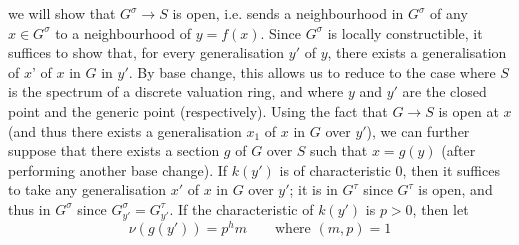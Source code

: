   we will show that \(G^\sigma \to  S\) is open, i.e. sends a neighbourhood in \(G^\sigma \) of any \(x\in  G^\sigma \) to a neighbourhood of \(y=f(x)\).
  Since \(G^\sigma \) is locally constructible, it suffices to show that, for every generalisation \(y'\) of \(y\), there exists a generalisation of \(x\)' of \(x\) in \(G\) in \(y'\).
  By base change, this allows us to reduce to the case where \(S\) is the spectrum of a discrete valuation ring, and where \(y\) and \(y'\) are the closed point and the generic point (respectively).
  Using the fact that \(G\to  S\) is open at \(x\) (and thus there exists a generalisation \(x_1\) of \(x\) in \(G\) over \(y'\)), we can further suppose that there exists a section \(g\) of \(G\) over \(S\) such that \(x=g(y)\) (after performing another base change).
  If \(k(y')\) is of characteristic \(0\), then it suffices to take any generalisation \(x'\) of \(x\) in \(G\) over \(y'\);
  it is in \(G^\tau \) since \(G^\tau \) is open, and thus in \(G^\sigma \) since \(G_{y'}^\sigma =G_{y'}^\tau \).
  If the characteristic of \(k(y')\) is \(p>0\), then let
  \[     \nu (g(y'))     = p^hm     \qquad \text {where }(m,p)=1   \]
  

